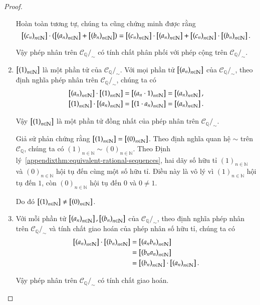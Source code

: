 \begin{proof}
\begin{enumerate}[label={(\roman*)}]
              Hoàn toàn tương tự, chúng ta cũng chứng minh được rằng
              \[
                  \left[{\left({c_{n}}\right)}_{{n}\in\mathbb{N}}\right]\cdot \left(\left[{\left({a_{n}}\right)}_{{n}\in\mathbb{N}}\right] + \left[{\left({b_{n}}\right)}_{{n}\in\mathbb{N}}\right]\right) = \left[{\left({c_{n}}\right)}_{{n}\in\mathbb{N}}\right] \cdot \left[{\left({a_{n}}\right)}_{{n}\in\mathbb{N}}\right] + \left[{\left({c_{n}}\right)}_{{n}\in\mathbb{N}}\right] \cdot \left[{\left({b_{n}}\right)}_{{n}\in\mathbb{N}}\right].
              \]

              Vậy phép nhân trên $\mathscr{C}_{\mathbb{Q}}/_{\sim}$ có tính chất phân phối với phép cộng trên $\mathscr{C}_{\mathbb{Q}}/_{\sim}$.
        \item $\left[{\left({1}\right)}_{{n}\in\mathbb{N}}\right]$ là một phần tử của $\mathscr{C}_{\mathbb{Q}}/_{\sim}$. Với mọi phần tử $\left[{\left({a_{n}}\right)}_{{n}\in\mathbb{N}}\right]$ của $\mathscr{C}_{\mathbb{Q}}/_{\sim}$, theo định nghĩa phép nhân trên $\mathscr{C}_{\mathbb{Q}}/_{\sim}$, chúng ta có
              \begin{align*}
                  \left[{\left({a_{n}}\right)}_{{n}\in\mathbb{N}}\right]\cdot \left[{\left({1}\right)}_{{n}\in\mathbb{N}}\right] & = \left[{\left({a_{n}\cdot 1}\right)}_{{n}\in\mathbb{N}}\right] = \left[{\left({a_{n}}\right)}_{{n}\in\mathbb{N}}\right], \\
                  \left[{\left({1}\right)}_{{n}\in\mathbb{N}}\right]\cdot \left[{\left({a_{n}}\right)}_{{n}\in\mathbb{N}}\right] & = \left[{\left({1\cdot a_{n}}\right)}_{{n}\in\mathbb{N}}\right] = \left[{\left({a_{n}}\right)}_{{n}\in\mathbb{N}}\right].
              \end{align*}

              Vậy $\left[{\left({1}\right)}_{{n}\in\mathbb{N}}\right]$ là một phần tử đồng nhất của phép nhân trên $\mathscr{C}_{\mathbb{Q}}/_{\sim}$.

              Giả sử phản chứng rằng $\left[{\left({1}\right)}_{{n}\in\mathbb{N}}\right] = \left[{\left({0}\right)}_{{n}\in\mathbb{N}}\right]$. Theo định nghĩa quan hệ $\sim$ trên $\mathscr{C}_{\mathbb{Q}}$, chúng ta có ${(1)}_{n\in\mathbb{N}} \sim {(0)}_{n\in\mathbb{N}}$. Theo Định lý~\ref{appendixthm:equivalent-rational-sequences}, hai dãy số hữu tỉ ${(1)}_{n\in\mathbb{N}}$ và ${(0)}_{n\in\mathbb{N}}$ hội tụ đến cùng một số hữu tỉ. Điều này là vô lý vì ${(1)}_{n\in\mathbb{N}}$ hội tụ đến $1$, còn ${(0)}_{n\in\mathbb{N}}$ hội tụ đến $0$ và $0\ne 1$.

              Do đó $\left[{\left({1}\right)}_{{n}\in\mathbb{N}}\right]\ne \left[{\left({0}\right)}_{{n}\in\mathbb{N}}\right]$.
        \item Với mỗi phần tử $\left[{\left({a_{n}}\right)}_{{n}\in\mathbb{N}}\right], \left[{\left({b_{n}}\right)}_{{n}\in\mathbb{N}}\right]$ của $\mathscr{C}_{\mathbb{Q}}/_{\sim}$, theo định nghĩa phép nhân trên $\mathscr{C}_{\mathbb{Q}}/_{\sim}$ và tính chất giao hoán của phép nhân số hữu tỉ, chúng ta có
              \begin{align*}
                  \left[{\left({a_{n}}\right)}_{{n}\in\mathbb{N}}\right] \cdot \left[{\left({b_{n}}\right)}_{{n}\in\mathbb{N}}\right] & = \left[{\left({a_{n}b_{n}}\right)}_{{n}\in\mathbb{N}}\right]                     \\
                                                            & = \left[{\left({b_{n}a_{n}}\right)}_{{n}\in\mathbb{N}}\right]                     \\
                                                            & = \left[{\left({b_{n}}\right)}_{{n}\in\mathbb{N}}\right] \cdot \left[{\left({a_{n}}\right)}_{{n}\in\mathbb{N}}\right].
              \end{align*}

              Vậy phép nhân trên $\mathscr{C}_{\mathbb{Q}}/_{\sim}$ có tính chất giao hoán.
    \end{enumerate}
\end{proof}


